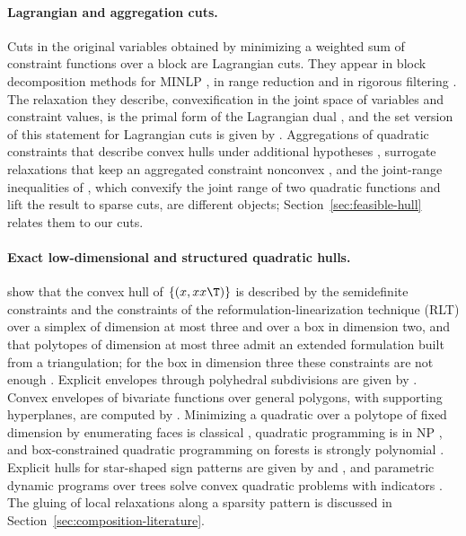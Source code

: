 \paragraph{Lagrangian and aggregation cuts.}
Cuts in the original variables obtained by minimizing a weighted sum of
constraint functions over a block are Lagrangian cuts. They appear in block
decomposition methods for MINLP \citep{Nowak2005,KaruppiahGrossmann2008,WuMutsNowakHendrix2025},
in range reduction \citep{TawarmalaniSahinidis2004,GleixnerEtAl2017} and in
rigorous filtering \citep{DomesNeumaier2016}. The relaxation they describe,
convexification in the joint space of variables and constraint values, is the
primal form of the Lagrangian dual
\citep{Falk1969,Geoffrion1974,FeltenmarkKiwiel2000,LemarechalRenaud2001}, and
the set version of this statement for Lagrangian cuts is given by
\citet{ChenLuedtke2022}. Aggregations of quadratic constraints that describe
convex hulls under additional hypotheses \citep{DeyMunozSerrano2022,BlekhermanDeySun2024},
surrogate relaxations that keep an aggregated constraint nonconvex
\citep{MullerEtAl2022}, and the joint-range inequalities of
\citet{XuPokutta2026}, which convexify the joint range of two quadratic
functions and lift the result to sparse cuts, are different objects; Section~\ref{sec:feasible-hull}
relates them to our cuts.

\paragraph{Exact low-dimensional and structured quadratic hulls.}
\citet{AnstreicherBurer2010} show that the convex hull of $\{(x,xx\T)\}$ is
described by the semidefinite constraints and the constraints of the
reformulation-linearization technique (RLT) \citep{Shor1987,SheraliAdams1990}
over a simplex of dimension at most three and over a box in dimension two,
and that polytopes of dimension at most three admit an extended formulation
built from a triangulation; for the box in dimension three these constraints
are not enough \citep{AnstreicherBurer2010,BurerLetchford2009,Anstreicher2012}.
Explicit envelopes through polyhedral subdivisions are given by
\citet{TawarmalaniRichardXiong2013}.
Convex envelopes of bivariate functions over general polygons, with
supporting hyperplanes, are computed by \citet{LocatelliSchoen2014}.
Minimizing a quadratic over a polytope of fixed dimension by enumerating
faces is classical \citep[Section~2.9]{Murty1997}, quadratic programming is in
NP \citep{Vavasis1990}, and box-constrained quadratic programming on forests
is strongly polynomial \citep{DelPiaKhajavirad2026}. Explicit hulls for
star-shaped sign patterns are given by \citet{DeyKhajavirad2025} and
\citet{Khajavirad2026}, and parametric dynamic programs over trees solve
convex quadratic problems with indicators \citep{BhathenaEtAl2025}. The
gluing of local relaxations along a sparsity pattern is discussed in
Section~\ref{sec:composition-literature}.

